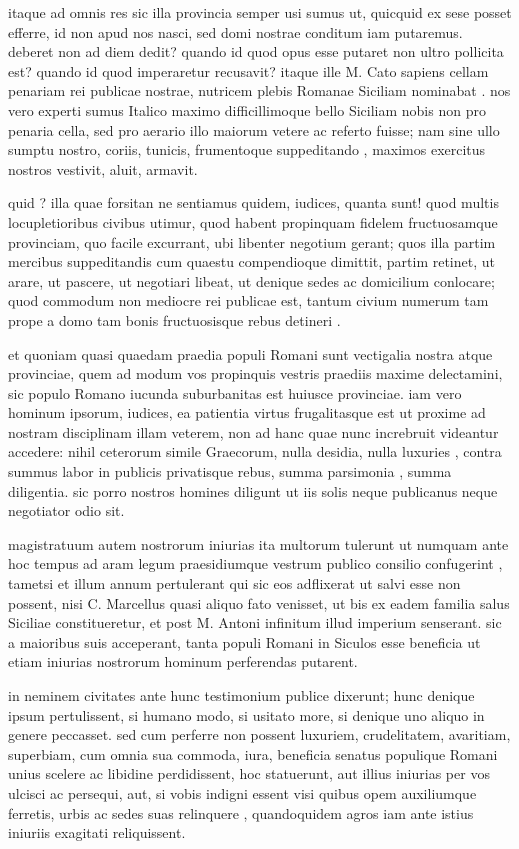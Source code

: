  itaque ad omnis res sic illa provincia semper usi sumus ut, quicquid ex sese posset efferre, id non apud nos nasci, sed domi nostrae conditum iam putaremus. deberet non ad diem dedit? quando id quod opus esse putaret non ultro pollicita est? quando id quod imperaretur recusavit? itaque ille M. Cato sapiens cellam penariam rei publicae nostrae, nutricem plebis Romanae Siciliam nominabat . nos vero experti sumus Italico maximo difficillimoque bello Siciliam nobis non pro penaria cella, sed pro aerario illo maiorum vetere ac referto fuisse; nam sine ullo sumptu nostro, coriis, tunicis, frumentoque suppeditando , maximos exercitus nostros vestivit, aluit, armavit.

 quid ? illa quae forsitan ne sentiamus quidem, iudices, quanta sunt! quod multis locupletioribus civibus utimur, quod habent propinquam fidelem fructuosamque provinciam, quo facile excurrant, ubi libenter negotium gerant; quos illa partim mercibus suppeditandis cum quaestu compendioque dimittit, partim retinet, ut arare, ut pascere, ut negotiari libeat, ut denique sedes ac domicilium conlocare; quod commodum non mediocre rei publicae est, tantum civium numerum tam prope a domo tam bonis fructuosisque rebus detineri .

 et quoniam quasi quaedam praedia populi Romani sunt vectigalia nostra atque provinciae, quem ad modum vos propinquis vestris praediis maxime delectamini, sic populo Romano iucunda suburbanitas est huiusce provinciae. iam vero hominum ipsorum, iudices, ea patientia virtus frugalitasque est ut proxime ad nostram disciplinam illam veterem, non ad hanc quae nunc increbruit videantur accedere: nihil ceterorum simile Graecorum, nulla desidia, nulla luxuries , contra summus labor in publicis privatisque rebus, summa parsimonia , summa diligentia. sic porro nostros homines diligunt ut iis solis neque publicanus neque negotiator odio sit.

 magistratuum autem nostrorum iniurias ita multorum tulerunt ut numquam ante hoc tempus ad aram legum praesidiumque vestrum publico consilio confugerint , tametsi et illum annum pertulerant qui sic eos adflixerat ut salvi esse non possent, nisi C. Marcellus quasi aliquo fato venisset, ut bis ex eadem familia salus Siciliae constitueretur, et post M. Antoni infinitum illud imperium senserant. sic a maioribus suis acceperant, tanta populi Romani in Siculos esse beneficia ut etiam iniurias nostrorum hominum perferendas putarent.

 in neminem civitates ante hunc testimonium publice dixerunt; hunc denique ipsum pertulissent, si humano modo, si usitato more, si denique uno aliquo in genere peccasset. sed cum perferre non possent luxuriem, crudelitatem, avaritiam, superbiam, cum omnia sua commoda, iura, beneficia senatus populique Romani unius scelere ac libidine perdidissent, hoc statuerunt, aut illius iniurias per vos ulcisci ac persequi, aut, si vobis indigni essent visi quibus opem auxiliumque ferretis, urbis ac sedes suas relinquere , quandoquidem agros iam ante istius iniuriis exagitati reliquissent.

